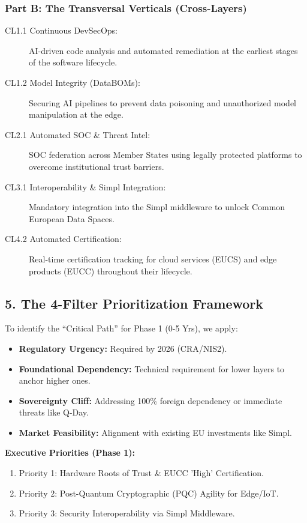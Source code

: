 \documentclass[12pt,a4paper]{article}
\begin{document}
\subsubsection{Part B: The Transversal Verticals (Cross-Layers)}
\begin{description}
    \item[CL1.1 Continuous DevSecOps:] AI-driven code analysis and automated remediation at the earliest stages of the software lifecycle.
    \item[CL1.2 Model Integrity (DataBOMs):] Securing AI pipelines to prevent data poisoning and unauthorized model manipulation at the edge.
    \item[CL2.1 Automated SOC \& Threat Intel:] SOC federation across Member States using legally protected platforms to overcome institutional trust barriers.
    \item[CL3.1 Interoperability \& Simpl Integration:] Mandatory integration into the Simpl middleware to unlock Common European Data Spaces.
    \item[CL4.2 Automated Certification:] Real-time certification tracking for cloud services (EUCS) and edge products (EUCC) throughout their lifecycle.
\end{description}

\subsection{5. The 4-Filter Prioritization Framework}
To identify the ``Critical Path''  for Phase 1 (0-5 Yrs), we apply:
\begin{itemize}
    \item \textbf{Regulatory Urgency:} Required by 2026 (CRA/NIS2).
    \item \textbf{Foundational Dependency:} Technical requirement for lower layers to anchor higher ones.
    \item \textbf{Sovereignty Cliff:} Addressing 100\% foreign dependency or immediate threats like Q-Day.
    \item \textbf{Market Feasibility:} Alignment with existing EU investments like Simpl.
\end{itemize}

\noindent \textbf{Executive Priorities (Phase 1):}
\begin{enumerate}
    \item Priority 1: Hardware Roots of Trust \& EUCC 'High' Certification.
    \item Priority 2: Post-Quantum Cryptographic (PQC) Agility for Edge/IoT.
    \item Priority 3: Security Interoperability via Simpl Middleware.
\end{enumerate}
\end{document}
